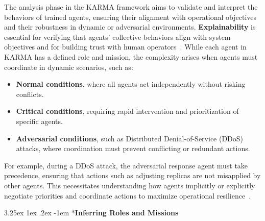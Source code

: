 \documentclass[conference]{IEEEtran}
\makeatletter
\renewcommand\paragraph{\@startsection{paragraph}{5}{\z@}%
  {3.25ex \@plus1ex \@minus.2ex}%
  {-1em}%
  {\normalfont\normalsize\bfseries}}
\makeatother
\begin{document}
The analysis phase in the KARMA framework aims to validate and interpret the behaviors of trained agents, ensuring their alignment with operational objectives and their robustness in dynamic or adversarial environments. \textbf{Explainability} is essential for verifying that agents' collective behaviors align with system objectives and for building trust with human operators~\cite{biran2017explanation, guidotti2018survey}. While each agent in KARMA has a defined role and mission, the complexity arises when agents must coordinate in dynamic scenarios, such as:
\begin{itemize}
    \item \textbf{Normal conditions}, where all agents act independently without risking conflicts.
    \item \textbf{Critical conditions}, requiring rapid intervention and prioritization of specific agents.
    \item \textbf{Adversarial conditions}, such as Distributed Denial-of-Service (DDoS) attacks, where coordination must prevent conflicting or redundant actions.
\end{itemize}

For example, during a DDoS attack, the adversarial response agent must take precedence, ensuring that actions such as adjusting replicas are not misapplied by other agents. This necessitates understanding how agents implicitly or explicitly negotiate priorities and coordinate actions to maximize operational resilience~\cite{shoham2008multiagent}.

\paragraph*{\textbf{Inferring Roles and Missions}}
\end{document}
